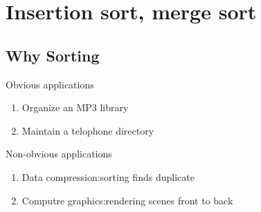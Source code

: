 \section{Insertion sort, merge sort}
\subsection{Why Sorting}

Obvious applications
\begin{enumerate}
    \item Organize an MP3 library
    \item Maintain a telophone directory
\end{enumerate} 

\noindent Non-obvious applications
\begin{enumerate}
    \item Data compression:sorting finds duplicate
    \item Computre graphics:rendering scenes front to back
\end{enumerate}